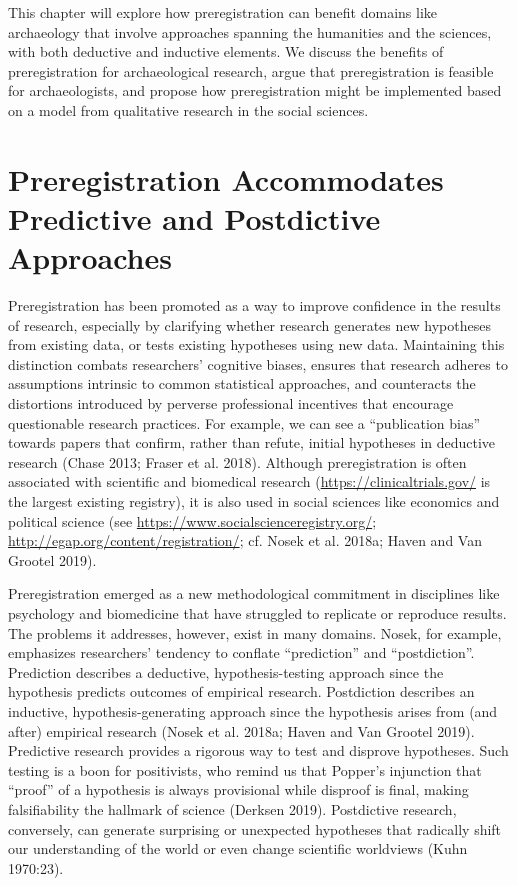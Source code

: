 \documentclass[article]{sa}
\begin{document}
This chapter will explore how preregistration can benefit domains like
archaeology that involve approaches spanning the humanities and the
sciences, with both deductive and inductive elements. We discuss the
benefits of preregistration for archaeological research, argue that
preregistration is feasible for archaeologists, and propose how
preregistration might be implemented based on a model from qualitative
research in the social sciences.

\section{Preregistration Accommodates
Predictive and Postdictive Approaches}

Preregistration has been promoted as a way to improve confidence in the
results of research, especially by clarifying whether research generates
new hypotheses from existing data, or tests existing hypotheses using
new data. Maintaining this distinction combats researchers' cognitive
biases, ensures that research adheres to assumptions intrinsic to common
statistical approaches, and counteracts the distortions introduced by
perverse professional incentives that encourage questionable research
practices. For example, we can see a ``publication bias'' towards papers
that confirm, rather than refute, initial hypotheses in deductive
research (Chase 2013; Fraser et al. 2018). Although preregistration is
often associated with scientific and biomedical research
(\url{https://clinicaltrials.gov/} is the largest existing registry), it
is also used in social sciences like economics and political science
(see \url{https://www.socialscienceregistry.org/};
\url{http://egap.org/content/registration/}; cf. Nosek et al. 2018a; Haven and
Van Grootel 2019).

Preregistration emerged as a new methodological commitment in
disciplines like psychology and biomedicine that have struggled to
replicate or reproduce results. The problems it addresses, however,
exist in many domains. Nosek, for example, emphasizes researchers'
tendency to conflate ``prediction'' and ``postdiction''. Prediction
describes a deductive, hypothesis-testing approach since the hypothesis
predicts outcomes of empirical research. Postdiction describes an
inductive, hypothesis-generating approach since the hypothesis arises
from (and after) empirical research (Nosek et al. 2018a; Haven and Van
Grootel 2019). Predictive research provides a rigorous way to test and
disprove hypotheses. Such testing is a boon for positivists, who remind
us that Popper's injunction that ``proof'' of a hypothesis is always
provisional while disproof is final, making falsifiability the hallmark
of science (Derksen 2019). Postdictive research, conversely, can
generate surprising or unexpected hypotheses that radically shift our
understanding of the world or even change scientific worldviews (Kuhn
1970:23).
\end{document}

